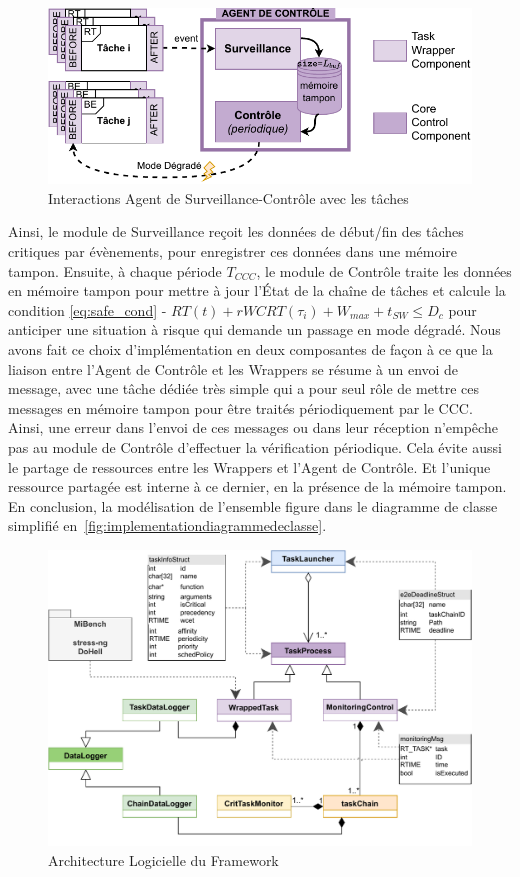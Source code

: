 \documentclass[french, a4paper, 11pt, twoside, pdftex]{StyleThese}
\begin{document}
	\begin{figure}[ht]
		\centering
		\includegraphics[width=0.8\linewidth]{schemas/AgentSurveillance_Controle}
		\caption{Interactions Agent de Surveillance-Contrôle avec les tâches}
		\label{fig:agentsurveillancecontrole}
	\end{figure}
	Ainsi, le module de Surveillance reçoit les données de début/fin des tâches critiques par évènements, pour enregistrer ces données dans une mémoire tampon. Ensuite, à chaque période $T_{CCC}$, le module de Contrôle traite les données en mémoire tampon pour mettre à jour l’État de la chaîne de tâches et calcule la condition \autoref{eq:safe_cond} - $ RT(t) + rWCRT(\tau_i) + W_{max} + t_{SW} \leq D_c $ pour anticiper une situation à risque qui demande un passage en mode dégradé.
	Nous avons fait ce choix d'implémentation en deux composantes de façon à ce que la liaison entre l'Agent de Contrôle et les Wrappers se résume à un envoi de message, avec une tâche dédiée très simple qui a pour seul rôle de mettre ces messages en mémoire tampon pour être traités périodiquement par le CCC. Ainsi, une erreur dans l'envoi de ces messages ou dans leur réception n'empêche pas au module de Contrôle d'effectuer la vérification périodique. Cela évite aussi le partage de ressources entre les Wrappers et l'Agent de Contrôle. Et l'unique ressource partagée est interne à ce dernier, en la présence de la mémoire tampon. En conclusion, la modélisation de l'ensemble figure dans le diagramme de classe simplifié en~\autoref{fig:implementationdiagrammedeclasse}.
	
	\pagebreak
	
	\begin{figure}[ht]
		\centering
		\includegraphics[width=\linewidth]{schemas/Implementation_DiagrammeDeClasse}
		\caption{Architecture Logicielle du Framework}
		\label{fig:implementationdiagrammedeclasse}
	\end{figure}
    
\end{document}

